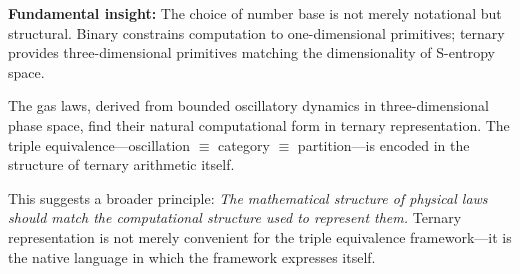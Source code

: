 \textbf{Fundamental insight:} The choice of number base is not merely notational but structural. Binary constrains computation to one-dimensional primitives; ternary provides three-dimensional primitives matching the dimensionality of S-entropy space.

The gas laws, derived from bounded oscillatory dynamics in three-dimensional phase space, find their natural computational form in ternary representation. The triple equivalence---oscillation $\equiv$ category $\equiv$ partition---is encoded in the structure of ternary arithmetic itself.

This suggests a broader principle: \textit{The mathematical structure of physical laws should match the computational structure used to represent them.} Ternary representation is not merely convenient for the triple equivalence framework---it is the native language in which the framework expresses itself.
